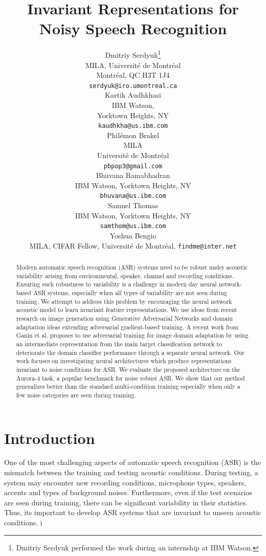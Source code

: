 \documentclass{article}
\title{Invariant Representations for Noisy Speech Recognition}
\author{
  Dmitriy Serdyuk\thanks{Dmitriy Serdyuk performed the work 
    during an internship at IBM Watson.} \\
  MILA,
  Universit\'e de Montr\'eal\\
  Montr\'eal, QC H3T 1J4 \\
  \texttt{serdyuk@iro.umontreal.ca} \\
  \And
  Kartik Audhkhasi \\
  IBM Watson, \\
  Yorktown Heights, NY \\
  \texttt{kaudhkha@us.ibm.com} \\
  \And
  Phil\'emon Brakel \\
  MILA\\
  Universit\'e de Montr\'eal\\
  \texttt{pbpop3@gmail.com} \\
  \And
  Bhuvana Ramabhadran\\
  IBM Watson,
  Yorktown Heights, NY \\
  \texttt{bhuvana@us.ibm.com} \\
  \And
  Samuel Thomas\\
  IBM Watson,
  Yorktown Heights, NY \\
  \texttt{samthom@us.ibm.com} \\
  \And
  Yoshua Bengio\\
  MILA, CIFAR Fellow,
  Universit\'e de Montr\'eal,
  \texttt{findme@inter.net} \\
}
\begin{document}
%
\maketitle
%
\begin{abstract}
    Modern automatic speech recognition (ASR) systems need to be robust under acoustic variability arising from environmental, speaker, channel and recording conditions. Ensuring such robustness to variability is a challenge in modern day neural network-based ASR systems, especially when all types of variability are not seen during training. We attempt to address this problem by encouraging the neural network acoustic model to learn invariant feature representations.
    We use ideas from recent research on image generation using
    Generative Adversarial Networks and domain adaptation ideas extending
    adversarial gradient-based training. A recent work from Ganin et al. proposes to
    use adversarial training for image domain adaptation by using an intermediate
    representation from the main target classification network to deteriorate the domain 
    classifier performance through a separate neural network.
    Our work focuses on investigating neural architectures which produce
    representations invariant to noise conditions for ASR.  We evaluate the proposed architecture on the Aurora-4 task, a popular benchmark for
    noise robust ASR. We show that our method generalizes better than the standard multi-condition training especially when only a few noise categories are seen during training.
\end{abstract}
%
%
\section{Introduction}
\label{sec:intro}
    One of the most challenging aspects of automatic speech recognition (ASR)
    is the mismatch between the training and testing acoustic conditions. During
    testing, a system may encounter new recording conditions, microphone types, speakers,
    accents and types of background noises. Furthermore, even if the test scenarios are seen during training, there can be significant variability in their statistics. Thus, its important to develop ASR systems that are invariant to unseen acoustic conditions.
    i%
\end{document}
